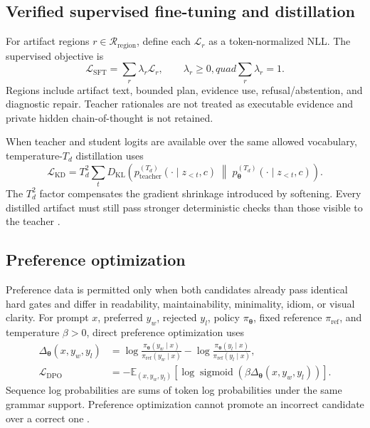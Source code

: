 \documentclass[10pt,letterpaper]{article}
\newcommand{\E}{\mathbb{E}}
\newcommand{\1}{\mathbb{1}}
\newcommand{\vect}[1]{\bm{#1}}
\newcommand{\sigmoid}{\operatorname{sigmoid}}
\newcommand{\KL}{D_{\mathrm{KL}}}
\begin{document}
\subsection{Verified supervised fine-tuning and distillation}

For artifact regions $r\in\mathcal R_{\mathrm{region}}$, define each
$\mathcal L_r$ as a token-normalized NLL.  The supervised objective is
\begin{equation}
  \mathcal L_{\mathrm{SFT}}=\sum_r\lambda_r\mathcal L_r,
  \qquad \lambda_r\ge0,quad\sum_r\lambda_r=1.
  \label{eq:sft}
\end{equation}
Regions include artifact text, bounded plan, evidence use, refusal/abstention, and diagnostic repair.
Teacher rationales are not treated as executable evidence and private hidden chain-of-thought is not
retained.

When teacher and student logits are available over the same allowed vocabulary, temperature-$T_d$
distillation uses
\begin{equation}
  \mathcal L_{\mathrm{KD}}
  =T_d^2\sum_t
  \KL\!\left(
    p_{\mathrm{teacher}}^{(T_d)}(\cdot\mid z_{<t},c)
    \;\middle\|\;
    p_{\vect\theta}^{(T_d)}(\cdot\mid z_{<t},c)
  \right).
  \label{eq:distillation}
\end{equation}
The $T_d^2$ factor compensates the gradient shrinkage introduced by softening.  Every distilled
artifact must still pass stronger deterministic checks than those visible to the teacher
\cite{hsieh2023distill}.

\subsection{Preference optimization}

Preference data is permitted only when both candidates already pass identical hard gates and differ
in readability, maintainability, minimality, idiom, or visual clarity.  For prompt $x$, preferred
$y_w$, rejected $y_l$, policy $\pi_{\vect\theta}$, fixed reference $\pi_{\mathrm{ref}}$, and
temperature $\beta>0$, direct preference optimization uses
\begin{align}
  \Delta_{\vect\theta}(x,y_w,y_l)
  &=\log\frac{\pi_{\vect\theta}(y_w\mid x)}{\pi_{\mathrm{ref}}(y_w\mid x)}
   -\log\frac{\pi_{\vect\theta}(y_l\mid x)}{\pi_{\mathrm{ref}}(y_l\mid x)},\\
  \mathcal L_{\mathrm{DPO}}
  &=-\E_{(x,y_w,y_l)}\left[
    \log\sigmoid\!\left(\beta\Delta_{\vect\theta}(x,y_w,y_l)\right)
  \right].
  \label{eq:dpo}
\end{align}
Sequence log probabilities are sums of token log probabilities under the same grammar support.
Preference optimization cannot promote an incorrect candidate over a correct one
\cite{rafailov2023dpo}.
\end{document}
